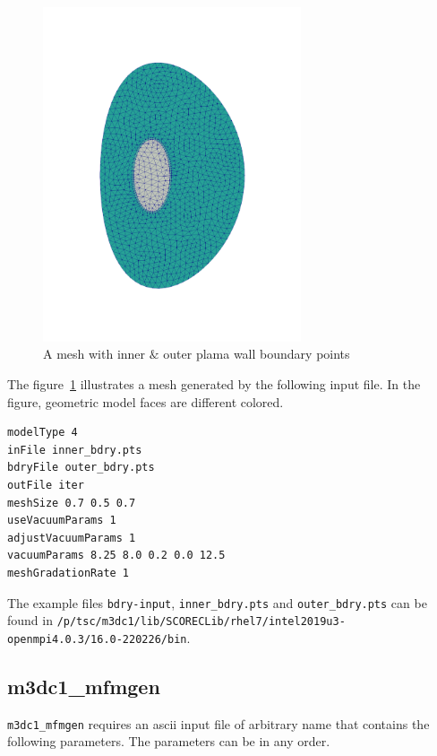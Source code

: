 \begin{figure}
\centering
\includegraphics[width=3in]{./figures/meshgen-type4.pdf}
\caption[Mesh with inner $\&$ outer plasma wall boundary points]
{A mesh with inner $\&$ outer plama wall boundary points}
\label{fig:meshgen-type4}
\end{figure}

The figure~\ref{fig:meshgen-type4} illustrates a mesh generated by the following input file. In the figure, geometric model faces are different colored.

\begin{verbatim}
modelType 4
inFile inner_bdry.pts
bdryFile outer_bdry.pts
outFile iter
meshSize 0.7 0.5 0.7
useVacuumParams 1
adjustVacuumParams 1
vacuumParams 8.25 8.0 0.2 0.0 12.5
meshGradationRate 1
\end{verbatim}

The example files \texttt{bdry-input}, \texttt{inner\_bdry.pts} and \texttt{outer\_bdry.pts} can be found in
\newline\newline
\texttt{/p/tsc/m3dc1/lib/SCORECLib/rhel7/intel2019u3-openmpi4.0.3/16.0-220226/bin}.

\subsection{m3dc1\_mfmgen}
\label{ch:mfm-gen}

\texttt{m3dc1\_mfmgen} requires an ascii input file of arbitrary name that contains the following parameters.
The parameters can be in any order.

